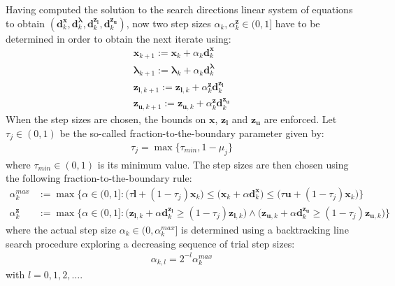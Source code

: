   Having computed the solution to the search directions linear system of equations to obtain $(\bm{d}_k^{\bm{x}}, \bm{d}_k^{\bm{\lambda}}, \bm{d}_k^{\bm{z}_{\bm{l}}}, \bm{d}_k^{\bm{z}_{\bm{u}}})$, now two step sizes $\alpha_k, \alpha_k^{\bm{z}} \in (0, 1]$ have to be determined in order to obtain the next iterate using:
  \begin{align}
      \bm{x}_{k+1} := \bm{x}_k + \alpha_k \bm{d}_k^{\bm{x}} \\
      \bm{\lambda}_{k+1} := \bm{\lambda}_k + \alpha_k \bm{d}_k^{\bm{\lambda}} \\
      \bm{z}_{\bm{l}, k+1} := \bm{z}_{\bm{l}, k} + \alpha_k^{\bm{z}} \bm{d}_k^{\bm{z}_{\bm{l}}} \\
      \bm{z}_{\bm{u},k+1} := \bm{z}_{\bm{u}, k} + \alpha_k^{\bm{z}} \bm{d}_k^{\bm{z}_{\bm{u}}}
  \end{align}
  When the step sizes are chosen, the bounds on $\bm{x}$, $\bm{z}_{\bm{l}}$ and $\bm{z}_{\bm{u}}$ are enforced. Let $\tau_j \in (0, 1)$ be the so-called fraction-to-the-boundary parameter given by:
  \begin{align}
      \tau_j = \max \{\tau_{min}, 1 - \mu_j \}
  \end{align}
  where $\tau_{min} \in (0, 1)$ is its minimum value. The step sizes are then chosen using the following fraction-to-the-boundary rule:
  \begin{align}
      \alpha_k^{max} & := \max \Bigg\{ \alpha \in (0, 1] : \Big( \tau \bm{l} + (1 - \tau_j) \bm{x}_k \Big) \leq \Big( \bm{x}_k + \alpha \bm{d}_k^{\bm{x}} \Big) \leq \Big( \tau \bm{u} + (1 - \tau_j) \bm{x}_k \Big) \Bigg\} \\
      \alpha_k^{\bm{z}} & := \max \big\{ \alpha \in (0, 1] : \big( \bm{z}_{\bm{l}, k} + \alpha \bm{d}_k^{\bm{z}_{\bm{l}}} \geq (1 - \tau_j) \bm{z}_{\bm{l}, k} \big) \wedge \big( \bm{z}_{\bm{u}, k} + \alpha \bm{d}_k^{\bm{z}_{\bm{u}}} \geq (1 - \tau_j) \bm{z}_{\bm{u}, k} \big) \big\}
  \end{align}
  where the actual step size $\alpha_k \in (0, \alpha_k^{max}]$ is determined using a backtracking line search procedure exploring a decreasing sequence of trial step sizes: 
  \begin{align}
      \alpha_{k,l} = 2^{-l} \alpha_k^{max}
  \end{align}
  with $l = 0, 1, 2, \dots$.
  
